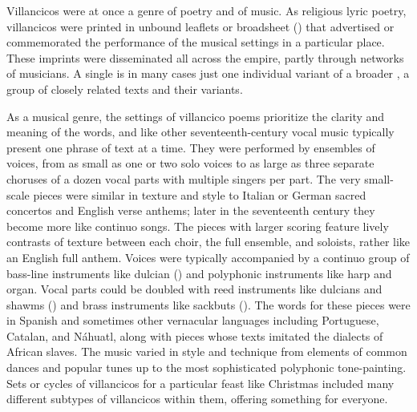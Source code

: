 Villancicos were at once a genre of poetry and of music.
As religious lyric poetry, villancicos were printed in unbound leaflets or
broadsheet () that advertised or commemorated the
performance of the musical settings in a particular place.%
    \Autocite{LopezLorenzo:VC-Sevillano}
These imprints were disseminated all across the empire, partly through networks
of musicians.
A single  is in many cases just one individual variant of
a broader , a group of closely related texts and their
variants.

As a musical genre, the settings of villancico poems prioritize the clarity and
meaning of the words, and like other seventeenth-century vocal music typically
present one phrase of text at a time.
They were performed by ensembles of voices, from as small as one or two solo
voices to as large as three separate choruses of a dozen vocal parts with
multiple singers per part.
The very small-scale pieces were similar in texture and style to Italian or
German sacred concertos and English verse anthems; later in the seventeenth
century they become more like continuo songs.%
    \Autocite{Kendrick:SacredSongs}
The pieces with larger scoring feature lively contrasts of texture between each
choir, the full ensemble, and soloists, rather like an English full anthem.
Voices were typically accompanied by a continuo group of bass-line instruments
like dulcian () and polyphonic instruments like harp and organ.
Vocal parts could be doubled with reed instruments like dulcians and shawms
() and brass instruments like sackbuts ().
The words for these pieces were in Spanish and sometimes other vernacular
languages including Portuguese, Catalan, and Náhuatl, along with pieces whose
texts imitated the dialects of African slaves.
The music varied in style and technique from elements of common dances
and popular tunes up to the most sophisticated polyphonic tone-painting.
Sets or cycles of villancicos for a particular feast like Christmas included
many different subtypes of villancicos within them, offering something for
everyone.

